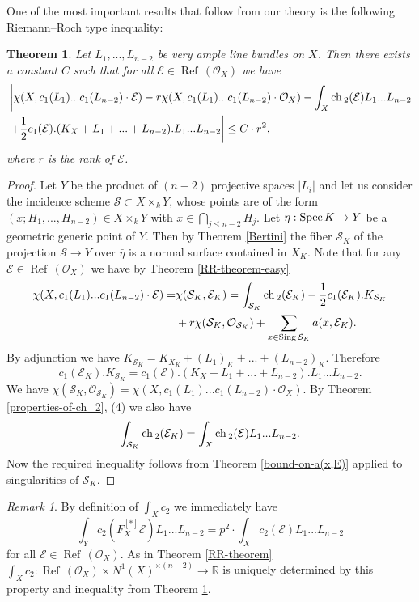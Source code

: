 \documentclass[twoside, 11pt]{article}
\theoremstyle{plain}
\newtheorem{Theorem}[Thm]{\sc Theorem}
\theoremstyle{definition}
\theoremstyle{remark}
\newtheorem{Remark}[Thm]{Remark}
\newcommand{\RR}{{\mathbb R}}
\newcommand{\cS}{{\mathcal S}}
\newcommand{\cE}{{\mathcal E}}
\newcommand{\cO}{{\mathcal O}}
\newcommand{\Refl}{{\mathop{\operatorname{Ref}\, }}}
\newcommand{\ch}{{\mathop{\rm ch \, }}}
\newcommand{\Spec}{{\mathop{{\rm Spec\, }}}}
\newcommand{\Sing}{{\mathop{{\rm Sing \,}}}}
\begin{document}
One of the most important results that follow from our theory is the following Riemann--Roch type
inequality:

\begin{Theorem}\label{main-consequence}
Let  $L_1, ..., L_{n-2}$ be very ample line bundles on $X$. Then there exists a constant $C$ such that for all
$\cE\in \Refl(\cO_X)$ we have
\begin{align*}
&\left\lvert \chi (X, c_1(L_1)... c_1(L_{n-2}) \cdot \cE) -r\chi (X, c_1(L_1)... c_1(L_{n-2}) \cdot \cO_X) -  \int _X \ch _2 (\cE)L_1...L_{n-2}  \right. \\
 & \left. +\frac{1}{2}   c_1(\cE).(K_X+L_1+...+L_{n-2}). L_1...L_{n-2} 
\right\rvert \le C\cdot r^2,
    \end{align*}
where $r$ is the rank of $\cE$.
\end{Theorem}

\begin{proof}
Let $Y$ be the product of $(n-2)$ projective spaces $|L_i|$ and let us consider the incidence scheme $\cS\subset X\times _k Y$, whose points are  of the form $(x;H_1,..., H_{n-2})\in X\times _kY$ with $x\in \bigcap _{j\le n-2} H_j $.
Let $\bar\eta: \Spec K\to Y$ be a geometric generic point of $Y$. Then by Theorem \ref{Bertini}
the fiber $\cS_K$ of the projection $\cS\to Y$ over $\bar \eta$ is a normal surface contained in  $X_K$.
Note that for any $\cE \in \Refl(\cO_X)$  we have by Theorem \ref{RR-theorem-easy}
\begin{align*}
 \chi (X, c_1(L_1)... c_1(L_{n-2}) \cdot \cE) =&\chi (\cS _K, \cE _K)= \int_{\cS _K}\ch_2 (\cE _K)
 - \frac {1}{2}c_1 (\cE _K). K_{\cS _K}\\ 
&+r \chi (\cS _K, \cO_{\cS _K})+\sum _{x\in \Sing \cS _K} a(x, \cE _K).
\end{align*}
By adjunction we have $K_{\cS _K} =K_{X_K}+(L_1)_K+...+(L_{n-2})_K$.
Therefore $$c_1 (\cE _K). K_{\cS _K}= c_1(\cE).(K_X+L_1+...+L_{n-2}). L_1...L_{n-2}.$$
We have $\chi (\cS _K, \cO_{\cS _K})=\chi (X, c_1(L_1)... c_1(L_{n-2}) \cdot \cO_X).$
By Theorem \ref{properties-of-ch_2}, (4)
we also have $$\int_{\cS _K}\ch_2 (\cE _K)= \int _X \ch_2 (\cE) L_1...L_{n-2}.$$
Now the required inequality follows from Theorem \ref{bound-on-a(x,E)} applied to singularities of $\cS _K$.
\end{proof}

\medskip
 
\begin{Remark}\label{determinacy-c_2-higher-dim}
By definition of $\int_Xc_2$ we immediately have
$$\int_Yc_2 ( F_X ^{[*]}\cE) L_1...L_{n-2}= p^2 \cdot \int_Xc_2(\cE)L_1...L_{n-2}$$
 for all $\cE\in \Refl(\cO_X)$.
As in Theorem \ref{RR-theorem} $\int_Xc_2 : \Refl(\cO_X)\times N^1( X) ^{\times (n-2)}\to \RR$ is uniquely determined by 
this property and  inequality from Theorem \ref{main-consequence}.
\end{Remark}
\end{document}
